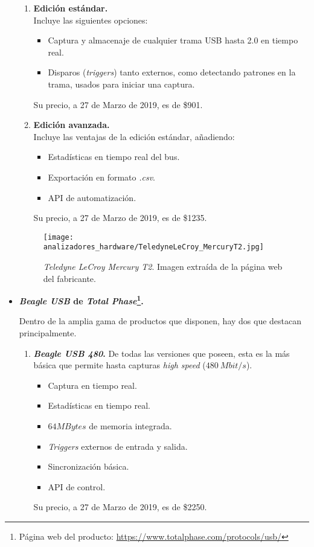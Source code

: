 \begin{itemize}
    \begin{enumerate}
        \item \textbf{Edición estándar.} \\
        Incluye las siguientes opciones:
        \begin{itemize}
            \item Captura y almacenaje de cualquier trama USB hasta 2.0 en tiempo real.
            \item Disparos (\emph{triggers}) tanto externos, como detectando patrones en la trama, usados para iniciar una captura. 
        \end{itemize}
        Su precio, a 27 de Marzo de 2019, es de \$901.
        
        \item \textbf{Edición avanzada.} \\
        Incluye las ventajas de la edición estándar, añadiendo:
        \begin{itemize}
            \item Estadísticas en tiempo real del bus.
            \item Exportación en formato \emph{.csv}.
            \item API de automatización.
        \end{itemize}
        Su precio, a 27 de Marzo de 2019, es de \$1235.
    \end{enumerate}
    \begin{figure}[htb]
        \centering
        \texttt{[image: analizadores\_hardware/TeledyneLeCroy\_MercuryT2.jpg]}
        \caption{\emph{Teledyne LeCroy Mercury T2}. Imagen extraída de la página web del fabricante.}
        \label{fig:TeledyneLeCroy-MercuryT2}
    \end{figure}

    \item \textbf{\emph{Beagle USB} de \emph{Total Phase}\footnote{Página web del producto: \url{https://www.totalphase.com/protocols/usb/}}.}
    
    Dentro de la amplia gama de productos que disponen, hay dos que destacan principalmente.
    \begin{enumerate}
        \item \textbf{\emph{Beagle USB 480}\cite{totalphase12-2018}.}
        De todas las versiones que poseen, esta es la más básica que permite hasta capturas \emph{high speed} ($480~Mbit/s$).
        \begin{itemize}
            \item Captura en tiempo real.
            \item Estadísticas en tiempo real.
            \item $64MBytes$ de memoria integrada.
            \item \emph{Triggers} externos de entrada y salida.
            \item Sincronización básica.
            \item API de control.
        \end{itemize}
        Su precio, a 27 de Marzo de 2019, es de \$2250.
        

\end{enumerate}
\end{itemize}
